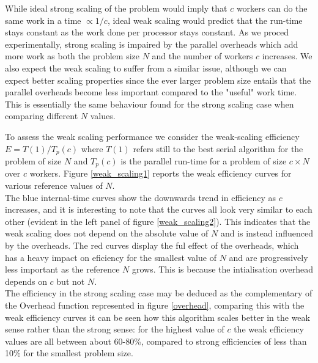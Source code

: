 \documentclass{article}
\begin{document}
While ideal strong scaling of the problem would imply that $c$ workers can do the same work in a time $\propto 1/c$, ideal weak scaling would predict that the run-time stays constant as the work done  per processor stays constant. As we proced experimentally, strong scaling is impaired by the parallel overheads which add more work as both the problem size $N$ and the number of workers $c$ increases. We also expect the weak scaling to suffer from a similar issue, although we can expect better scaling properties since the ever larger problem size entails that the parallel overheads become less important compared to the "useful" work time. This is essentially the same behaviour found for the strong scaling case when comparing different $N$ values.
\par 
To assess the weak scaling performance we consider the weak-scaling efficiency $E = T \left( 1 \right) / T_p \left( c \right) $ where $T \left( 1 \right)$ refers still to the best serial algorithm for the problem of size $N$ and $T_p \left( c \right)$ is the parallel run-time for a problem of size $c\times N$ over $c$ workers. Figure \ref{weak_scaling1} reports the weak efficiency curves for various reference values of $N$.\\
The blue internal-time curves show the downwards trend in efficiency as $c$ increases, and it is interesting to note that the curves all look very similar to each other (evident in the left panel of figure \ref{weak_scaling2}). This indicates that the weak scaling does not depend on the absolute value of $N$ and is instead influenced by the overheads. The red curves display the ful effect of the overheads, which has a heavy impact on eficiency for the smallest value of $N$ and are progressively less important as the reference $N$ grows. This is because the intialisation overhead depends on $c$ but not $N$.\\
The efficiency in the strong scaling case may be deduced as the complementary of the Overhead function represented in figure \ref{overhead}, comparing this with the weak efficiency curves it can be seen how this algorithm scales better in the weak sense rather than the strong sense: for the highest value of $c$ the weak efficiency values are all between about 60-80\%, compared to strong efficiencies of less than 10\% for the smallest problem size.
\end{document}
